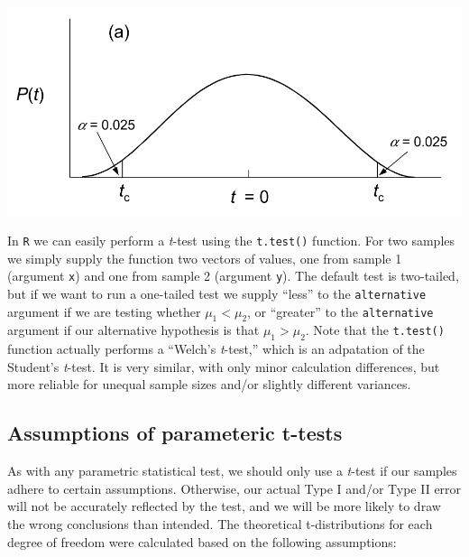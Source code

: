 \documentclass[]{book}
\begin{document}
\begin{center}\includegraphics[width=0.6\linewidth]{images/week_3.005_2_tailed} \end{center}

In \texttt{R} we can easily perform a \emph{t}-test using the \texttt{t.test()} function. For two samples we simply supply the function two vectors of values, one from sample 1 (argument \texttt{x}) and one from sample 2 (argument \texttt{y}). The default test is two-tailed, but if we want to run a one-tailed test we supply ``less'' to the \texttt{alternative} argument if we are testing whether \(\mu_1<\mu_2\), or ``greater'' to the \texttt{alternative} argument if our alternative hypothesis is that \(\mu_1>\mu_2\). Note that the \texttt{t.test()} function actually performs a ``Welch's \emph{t}-test,'' which is an adpatation of the Student's \emph{t}-test. It is very similar, with only minor calculation differences, but more reliable for unequal sample sizes and/or slightly different variances.

\hypertarget{assumptions-of-parameteric-t-tests}{%
\subsection{Assumptions of parameteric t-tests}\label{assumptions-of-parameteric-t-tests}}

As with any parametric statistical test, we should only use a \emph{t}-test if our samples adhere to certain assumptions. Otherwise, our actual Type I and/or Type II error will not be accurately reflected by the test, and we will be more likely to draw the wrong conclusions than intended. The theoretical t-distributions for each degree of freedom were calculated based on the following assumptions:
\end{document}
